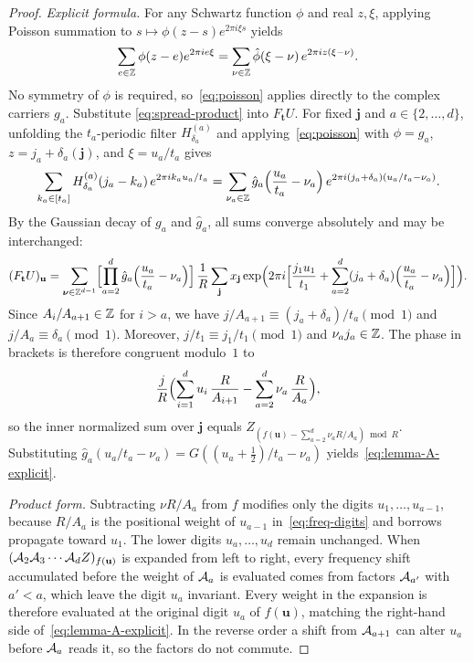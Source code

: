 \begin{proof}
\emph{Explicit formula.} For any Schwartz function $\phi$ and real $z,\xi$, applying Poisson summation to
$s\mapsto\phi(z-s)e^{2\pi i\xi s}$ yields
\begin{equation}\label{eq:poisson}
  \sum_{e\in\mathbb{Z}}\phi(z-e)e^{2\pi i e\xi}=\sum_{\nu\in\mathbb{Z}}\hat\phi(\xi-\nu)\,e^{2\pi i z(\xi-\nu)}.
\end{equation}
No symmetry of $\phi$ is required, so~\eqref{eq:poisson} applies directly to the complex carriers $g_a$. Substitute
\eqref{eq:spread-product} into $F_{\mathbf t}U$. For fixed $\mathbf j$ and $a\in\{2,\dots,d\}$, unfolding the
$t_a$-periodic filter $H^{(a)}_{\delta_a}$ and applying~\eqref{eq:poisson} with $\phi=g_a$, $z=j_a+\delta_a(\mathbf j)$,
and $\xi=u_a/t_a$ gives
\[
  \sum_{k_a\in[t_a]}H^{(a)}_{\delta_a}(j_a-k_a)\,e^{2\pi i k_a u_a/t_a}
  =\sum_{\nu_a\in\mathbb{Z}}\hat g_a\Bigl(\frac{u_a}{t_a}-\nu_a\Bigr)\,e^{2\pi i(j_a+\delta_a)(u_a/t_a-\nu_a)}.
\]
By the Gaussian decay of $g_a$ and $\hat g_a$, all sums converge absolutely and may be interchanged:
\[
  (F_{\mathbf t}U)_{\mathbf u}=\sum_{\boldsymbol\nu\in\mathbb{Z}^{d-1}}
  \Bigl[\prod_{a=2}^d\hat g_a\Bigl(\frac{u_a}{t_a}-\nu_a\Bigr)\Bigr]\,
  \frac1R\sum_{\mathbf j}x_{\mathbf j}
  \exp\Bigl(2\pi i\Bigl[\frac{j_1 u_1}{t_1}+\sum_{a=2}^d(j_a+\delta_a)\Bigl(\frac{u_a}{t_a}-\nu_a\Bigr)\Bigr]\Bigr).
\]
Since $A_i/A_{a+1}\in\mathbb{Z}$ for $i>a$, we have $j/A_{a+1}\equiv(j_a+\delta_a)/t_a\pmod 1$ and $j/A_a\equiv\delta_a\pmod 1$.
Moreover, $j/t_1\equiv j_1/t_1\pmod 1$ and $\nu_a j_a\in\mathbb{Z}$. The phase in brackets is therefore congruent modulo~$1$ to
\[
  \frac{j}{R}\Bigl(\sum_{i=1}^d u_i\,\frac{R}{A_{i+1}}-\sum_{a=2}^d\nu_a\,\frac{R}{A_a}\Bigr),
\]
so the inner normalized sum over $\mathbf j$ equals $Z_{(f(\mathbf u)-\sum_{a=2}^d\nu_a R/A_a)\bmod R}$. Substituting
$\hat g_a(u_a/t_a-\nu_a)=G((u_a+\tfrac12)/t_a-\nu_a)$ yields~\eqref{eq:lemma-A-explicit}.

\emph{Product form.} Subtracting $\nu R/A_a$ from $f$ modifies only the digits $u_1,\dots,u_{a-1}$, because $R/A_a$ is
the positional weight of $u_{a-1}$ in~\eqref{eq:freq-digits} and borrows propagate toward $u_1$. The lower digits
$u_a,\dots,u_d$ remain unchanged. When $(\mathcal{A}_2\mathcal{A}_3\cdots\mathcal{A}_d Z)_{f(\mathbf u)}$ is expanded from left to right, every
frequency shift accumulated before the weight of $\mathcal{A}_a$ is evaluated comes from factors $\mathcal{A}_{a'}$ with $a'<a$, which
leave the digit $u_a$ invariant. Every weight in the expansion is therefore evaluated at the original digit $u_a$ of
$f(\mathbf u)$, matching the right-hand side of~\eqref{eq:lemma-A-explicit}. In the reverse order a shift from
$\mathcal{A}_{a+1}$ can alter $u_a$ before $\mathcal{A}_a$ reads it, so the factors do not commute.
\end{proof}

